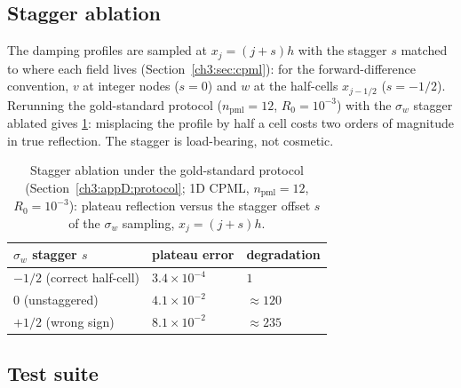 \subsection{Stagger ablation}
\label{ch3:appD:stagger}

The damping profiles are sampled at $x_j=(j+s)h$ with the stagger $s$
matched to where each field lives (Section~\ref{ch3:sec:cpml}): for the
forward-difference convention, $v$ at integer nodes ($s=0$) and $w$ at
the half-cells $x_{j-1/2}$ ($s=-1/2$).  Rerunning the gold-standard
protocol ($n_{\mathrm{pml}}=12$, $R_0=10^{-3}$) with the $\sigma_w$
stagger ablated gives \ref{ch3:appD:tab:stagger}: misplacing the
profile by half a cell costs two orders of magnitude in true
reflection.  The stagger is load-bearing, not cosmetic.

\begin{table}
\caption{Stagger ablation under the gold-standard protocol
(Section~\protect\ref{ch3:appD:protocol}; 1D CPML, $n_{\mathrm{pml}}=12$,
$R_0=10^{-3}$): plateau reflection versus the stagger offset $s$ of the
$\sigma_w$ sampling, $x_j=(j+s)h$.}
\label{ch3:appD:tab:stagger}
\begin{tabular}{lll}
\toprule
$\sigma_w$ stagger $s$ & plateau error & degradation \\
\midrule
$-1/2$ (correct half-cell) & $3.4\times10^{-4}$ & $1$ \\
$0$ (unstaggered)          & $4.1\times10^{-2}$ & ${\approx}120$ \\
$+1/2$ (wrong sign)        & $8.1\times10^{-2}$ & ${\approx}235$ \\
\bottomrule
\end{tabular}
\end{table}

\subsection{Test suite}
\label{ch3:appD:tests}

